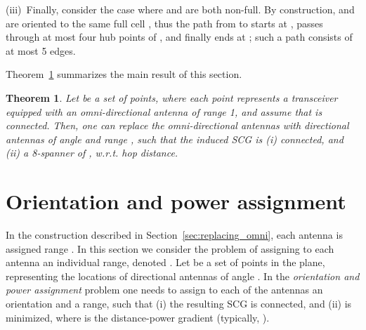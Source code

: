 \documentclass[11pt,letter]{article}
\newtheorem{theorem}{Theorem}[section]
\newcommand{\old}[1]{{{}}}
\begin{document}
(iii)~Finally, consider the case where  and  are both non-full.
By construction,  and  are oriented to the same full cell ,
thus the path from  to  starts at ,
passes through at most four hub points of , and finally ends at ;
such a path consists of at most 5 edges.




Theorem~\ref{thm:replacing_summary} summarizes the main result of this section.
\begin{theorem}
\label{thm:replacing_summary}
Let  be a set of points, where each point represents a transceiver equipped with an omni-directional antenna of range 1,
and assume that  is connected.
Then, one can replace the omni-directional antennas with directional antennas of angle  and range ,
such that the induced SCG is (i) connected, and (ii) a 8-spanner of , w.r.t. hop distance.
\end{theorem}



\old{
\begin{figure}[htb]
 \centering
 \subfigure[]{
    \centering
      \texttt{[image: fig/hopspanner6]}
        \label{fig:hopspanner6}
   }
   \subfigure[]{
     \centering
     \texttt{[image: fig/hopspanner5]}
     \label{fig:hopspanner5}
    }
    \subfigure[]{
     \centering
     \texttt{[image: fig/hopspanner4]}
     \label{fig:hopspanner4}
    }
    \caption{-hop distance}
\end{figure}
}







\section{Orientation and power assignment}\label{sec:power_assignment}

In the construction described in Section~\ref{sec:replacing_omni}, each antenna is assigned range .
In this section we consider the problem of assigning to each antenna  an individual range, denoted .
Let  be a set of  points in the plane, representing the locations of directional antennas of angle .
In the {\em orientation and power assignment} problem one needs to assign to each of the antennas an orientation and a range, such that
(i) the resulting SCG is connected, and (ii)  is minimized, where  is the distance-power gradient (typically, ).
\end{document}
